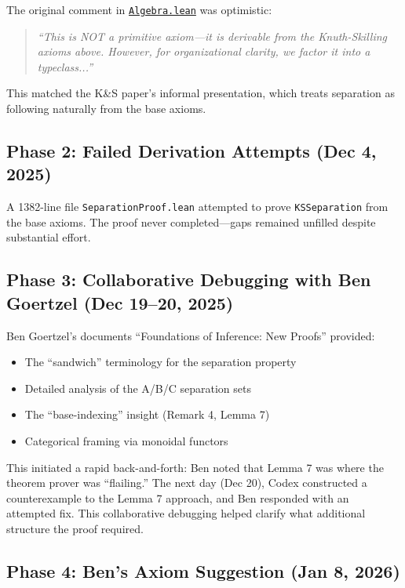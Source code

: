 \documentclass[11pt]{article}
\theoremstyle{definition}
\theoremstyle{remark}
\begin{document}
The original comment in \href{https://github.com/zariuq/ks-foundations-of-inference/blob/main/KnuthSkilling/Core/Algebra.lean}{\texttt{Algebra.lean}} was optimistic:

\begin{quote}
\textit{``This is NOT a primitive axiom---it is derivable from the Knuth-Skilling axioms above.
However, for organizational clarity, we factor it into a typeclass...''}
\end{quote}

This matched the K\&S paper's informal presentation, which treats separation as following
naturally from the base axioms.

\subsection*{Phase 2: Failed Derivation Attempts (Dec 4, 2025)}

A 1382-line file \texttt{SeparationProof.lean} attempted to prove \texttt{KSSeparation} from
the base axioms. The proof never completed---gaps remained unfilled despite substantial effort.

\subsection*{Phase 3: Collaborative Debugging with Ben Goertzel (Dec 19--20, 2025)}

Ben Goertzel's documents ``Foundations of Inference: New Proofs'' provided:
\begin{itemize}
\item The ``sandwich'' terminology for the separation property
\item Detailed analysis of the A/B/C separation sets
\item The ``base-indexing'' insight (Remark 4, Lemma 7)
\item Categorical framing via monoidal functors
\end{itemize}

This initiated a rapid back-and-forth: Ben noted that Lemma 7 was where the theorem prover
was ``flailing.'' The next day (Dec 20), Codex constructed a counterexample to the Lemma 7
approach, and Ben responded with an attempted fix. This collaborative debugging helped
clarify what additional structure the proof required.

\subsection*{Phase 4: Ben's Axiom Suggestion (Jan 8, 2026)}
\end{document}
